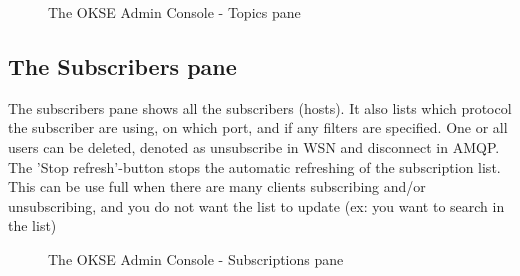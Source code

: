 \begin{center}
  \begin{figure}[ht!]
    \caption{The OKSE Admin Console - Topics pane} 
    \label{fig:OKSE Admin Console - Topics pane}
  \end{figure}
\end{center}

\subsection{The Subscribers pane}
The subscribers pane shows all the subscribers (hosts). It also lists which protocol the subscriber are using, on which port, and if any filters are specified. One or all users can be deleted, denoted as unsubscribe in WSN and disconnect in AMQP. The 'Stop refresh'-button stops the automatic refreshing of the subscription list. This can be use full when there are many clients subscribing and/or unsubscribing, and you do not want the list to update (ex: you want to search in the list)

\begin{center}
  \begin{figure}[ht!]
    \caption{The OKSE Admin Console - Subscriptions pane} 
    \label{fig:OKSE Admin Console - Subscriptions pane}
  \end{figure}
\end{center}

